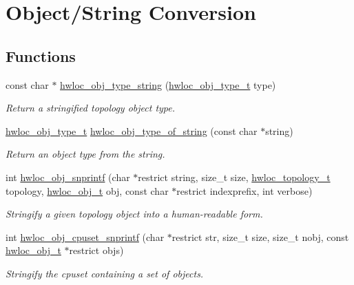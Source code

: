 \hypertarget{group__hwlocality__conversion}{
\section{Object/String Conversion}
\label{group__hwlocality__conversion}
}
\subsection*{Functions}
\begin{CompactItemize}
\item 
const char $\ast$ \hyperlink{group__hwlocality__conversion_g5ca0bf94bbbb080d0eff17a57bd90422}{hwloc\_\-obj\_\-type\_\-string} (\hyperlink{group__hwlocality__types_gcd37bb612667dc437d66bfb175a8dc55}{hwloc\_\-obj\_\-type\_\-t} type)
\begin{CompactList}\small\item\em Return a stringified topology object type. \item\end{CompactList}\item 
\hyperlink{group__hwlocality__types_gcd37bb612667dc437d66bfb175a8dc55}{hwloc\_\-obj\_\-type\_\-t} \hyperlink{group__hwlocality__conversion_g8a1eee67a1de115d264719157c109a20}{hwloc\_\-obj\_\-type\_\-of\_\-string} (const char $\ast$string)
\begin{CompactList}\small\item\em Return an object type from the string. \item\end{CompactList}\item 
int \hyperlink{group__hwlocality__conversion_g612dc210053b65d2466ac7ad39db92a4}{hwloc\_\-obj\_\-snprintf} (char $\ast$restrict string, size\_\-t size, \hyperlink{group__hwlocality__topology_g9d1e76ee15a7dee158b786c30b6a6e38}{hwloc\_\-topology\_\-t} topology, \hyperlink{structhwloc__obj}{hwloc\_\-obj\_\-t} obj, const char $\ast$restrict indexprefix, int verbose)
\begin{CompactList}\small\item\em Stringify a given topology object into a human-readable form. \item\end{CompactList}\item 
int \hyperlink{group__hwlocality__conversion_ge001fafdeda3a67695d406affde1ab0d}{hwloc\_\-obj\_\-cpuset\_\-snprintf} (char $\ast$restrict str, size\_\-t size, size\_\-t nobj, const \hyperlink{structhwloc__obj}{hwloc\_\-obj\_\-t} $\ast$restrict objs)
\begin{CompactList}\small\item\em Stringify the cpuset containing a set of objects. \item\end{CompactList}\end{CompactItemize}


